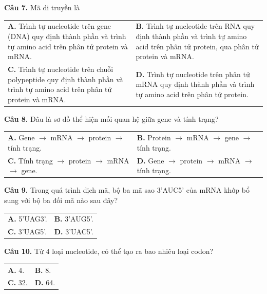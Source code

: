 \documentclass{article}
\begin{document}
\begin{minipage}[t][14.4cm][t]{\linewidth}
\fontsize{18}{23}\selectfont

\textbf{Câu 7.} Mã di truyền là\\[4pt]
\begin{tabularx}{\linewidth}{@{}X X@{}}
\textbf{A. } Trình tự nucleotide trên gene (DNA) quy định thành phần và trình tự amino acid trên phân tử protein và mRNA. & \textbf{B. } Trình tự nucleotide trên RNA quy định thành phần và trình tự amino acid trên phân tử protein, qua phân tử protein và mRNA.\\[4pt]
\textbf{C. } Trình tự nucleotide trên chuỗi polypeptide quy định thành phần và trình tự amino acid trên phân tử protein và mRNA. & \textbf{D. } Trình tự nucleotide trên phân tử mRNA quy định thành phần và trình tự amino acid trên phân tử protein.
\end{tabularx}
\vspace*{\fill}
\textbf{Câu 8.} Đâu là sơ đồ thể hiện mối quan hệ giữa gene và tính trạng?\\[4pt]
\begin{tabularx}{\linewidth}{@{}X X@{}}
\textbf{A. } Gene $\rightarrow$ mRNA $\rightarrow$ protein $\rightarrow$ tính trạng. & \textbf{B. } Protein $\rightarrow$ mRNA $\rightarrow$ gene $\rightarrow$ tính trạng.\\[4pt]
\textbf{C. } Tính trạng $\rightarrow$ protein $\rightarrow$ mRNA $\rightarrow$ gene. & \textbf{D. } Gene $\rightarrow$ protein $\rightarrow$ mRNA $\rightarrow$ tính trạng.
\end{tabularx}

\end{minipage}
\newpage


\begin{minipage}[t][14.4cm][t]{\linewidth}
\fontsize{25}{33}\selectfont

\textbf{Câu 9.} Trong quá trình dịch mã, bộ ba mã sao 3'AUC5' của mRNA khớp bổ sung với bộ ba đối mã nào sau đây?\\[4pt]
\begin{tabularx}{\linewidth}{@{}X X@{}}
\textbf{A. } 5'UAG3'. & \textbf{B. } 3'AUG5'.\\[4pt]
\textbf{C. } 3'UAG5'. & \textbf{D. } 3'UAC5'.
\end{tabularx}
\vspace*{\fill}
\textbf{Câu 10.} Từ 4 loại nucleotide, có thể tạo ra bao nhiêu loại codon?\\[4pt]
\begin{tabularx}{\linewidth}{@{}X X@{}}
\textbf{A. } 4. & \textbf{B. } 8.\\[4pt]
\textbf{C. } 32. & \textbf{D. } 64.
\end{tabularx}

\end{minipage}
\newpage
\end{document}
